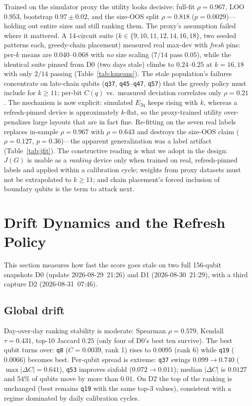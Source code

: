 \documentclass[journal,10pt,twocolumn]{IEEEtran}
\newcommand{\q}[1]{\texttt{q#1}}
\begin{document}
Trained on the simulator proxy the utility looks decisive: full-fit $\rho{=}0.967$, LOO $0.953$, bootstrap
$0.97{\pm}0.02$, and the size-OOS split $\rho{=}0.818$ ($p{=}0.0029$)---holding out entire sizes and still ranking
them. The proxy's assumption failed where it mattered. A 14-circuit suite
($k\in\{9,10,11,12,14,16,18\}$, two seeded patterns each, greedy-chain placement) measured real max-dev with
\emph{fresh} pins: per-$k$ means are $0.040$--$0.068$ with \emph{no} size scaling ($7/14$ pass $0.05$), while the
identical suite pinned from D0 (two days stale) climbs to $0.24$--$0.25$ at $k{=}16,18$ with only $2/14$ passing
(Table~\ref{tab:kmeans}). The stale population's failures concentrate on late-chain qubits (\q{37}, \q{45}--\q{47},
\q{57}) that the greedy policy must include for $k\ge11$; per-bit $C(q)$ vs.\ measured deviation correlates only
$\rho{=}0.21$. The mechanism is now explicit: simulated $E_{\mathrm{2q}}$ keeps rising with $k$, whereas a
refresh-pinned device is approximately $k$-flat, so the proxy-trained utility over-penalizes large layouts that are
in fact fine. Re-fitting on the seven real labels replaces in-sample $\rho{=}0.967$ with $\rho{=}0.643$ and destroys
the size-OOS claim ($\rho{=}0.127$, $p{=}0.36$)---the apparent generalization was a label artifact
(Table~\ref{tab:jfit}). The constructive reading is what we adopt in the design: $J(G)$ is usable as a
\emph{ranking} device only when trained on real, refresh-pinned labels and applied within a calibration cycle;
weights from proxy datasets must not be extrapolated to $k\ge11$; and chain placement's forced inclusion of
boundary qubits is the term to attack next.

\section{Drift Dynamics and the Refresh Policy}
\label{sec:drift}
This section measures how fast the score goes stale on two full 156-qubit snapshots D0 (update 2026-08-29~21:26)
and D1 (2026-08-30~21:29), with a third capture D2 (2026-08-31~07:46).

\subsection{Global drift}
\label{sec:driftglob}
Day-over-day ranking stability is moderate: Spearman $\rho{=}0.579$, Kendall $\tau{=}0.431$, top-10 Jaccard $0.25$
(only four of D0's best ten survive). The best qubit turns over: \q{8} ($C{=}0.0039$, rank 1) rises to $0.0095$
(rank 6) while \q{19} ($0.0066$) becomes best. Per-qubit spread is extreme: \q{37} swings $0.099{\to}0.740$
($\max|\Delta C|{=}0.641$), \q{53} improves sixfold ($0.072{\to}0.011$); median $|\Delta C|$ is $0.0127$ and $54\%$
of qubits move by more than $0.01$. On D2 the top of the ranking is unchanged (best remains \q{19} with the same
top-3 values), consistent with a regime dominated by daily calibration cycles.
\end{document}
